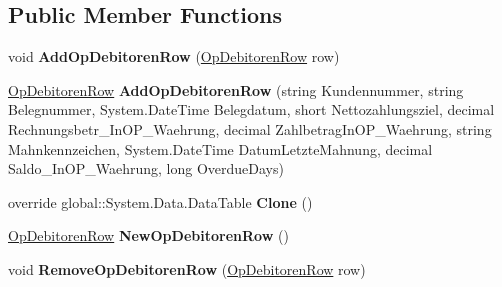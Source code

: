 \subsection*{Public Member Functions}
\begin{DoxyCompactItemize}
\item 
void {\bfseries Add\+Op\+Debitoren\+Row} (\hyperlink{class_products_1_1_data_1_1ds_sage_1_1_op_debitoren_row}{Op\+Debitoren\+Row} row)\hypertarget{class_products_1_1_data_1_1ds_sage_1_1_op_debitoren_data_table_a9ad8d7910df3f4941286c7f7f67b469a}{}\label{class_products_1_1_data_1_1ds_sage_1_1_op_debitoren_data_table_a9ad8d7910df3f4941286c7f7f67b469a}

\item 
\hyperlink{class_products_1_1_data_1_1ds_sage_1_1_op_debitoren_row}{Op\+Debitoren\+Row} {\bfseries Add\+Op\+Debitoren\+Row} (string Kundennummer, string Belegnummer, System.\+Date\+Time Belegdatum, short Nettozahlungsziel, decimal Rechnungsbetr\+\_\+\+In\+O\+P\+\_\+\+Waehrung, decimal Zahlbetrag\+In\+O\+P\+\_\+\+Waehrung, string Mahnkennzeichen, System.\+Date\+Time Datum\+Letzte\+Mahnung, decimal Saldo\+\_\+\+In\+O\+P\+\_\+\+Waehrung, long Overdue\+Days)\hypertarget{class_products_1_1_data_1_1ds_sage_1_1_op_debitoren_data_table_a7dc6c77c8dfd4ede458b0364cb8bbf32}{}\label{class_products_1_1_data_1_1ds_sage_1_1_op_debitoren_data_table_a7dc6c77c8dfd4ede458b0364cb8bbf32}

\item 
override global\+::\+System.\+Data.\+Data\+Table {\bfseries Clone} ()\hypertarget{class_products_1_1_data_1_1ds_sage_1_1_op_debitoren_data_table_a6bb3d0f8e20e1da116222d6611ef146e}{}\label{class_products_1_1_data_1_1ds_sage_1_1_op_debitoren_data_table_a6bb3d0f8e20e1da116222d6611ef146e}

\item 
\hyperlink{class_products_1_1_data_1_1ds_sage_1_1_op_debitoren_row}{Op\+Debitoren\+Row} {\bfseries New\+Op\+Debitoren\+Row} ()\hypertarget{class_products_1_1_data_1_1ds_sage_1_1_op_debitoren_data_table_ab12aa2c4155ac40204c63c3e3389c8e5}{}\label{class_products_1_1_data_1_1ds_sage_1_1_op_debitoren_data_table_ab12aa2c4155ac40204c63c3e3389c8e5}

\item 
void {\bfseries Remove\+Op\+Debitoren\+Row} (\hyperlink{class_products_1_1_data_1_1ds_sage_1_1_op_debitoren_row}{Op\+Debitoren\+Row} row)\hypertarget{class_products_1_1_data_1_1ds_sage_1_1_op_debitoren_data_table_ac1cf5b6256ffa85f106f3bbd36fa2d0b}{}\label{class_products_1_1_data_1_1ds_sage_1_1_op_debitoren_data_table_ac1cf5b6256ffa85f106f3bbd36fa2d0b}

\end{DoxyCompactItemize}

